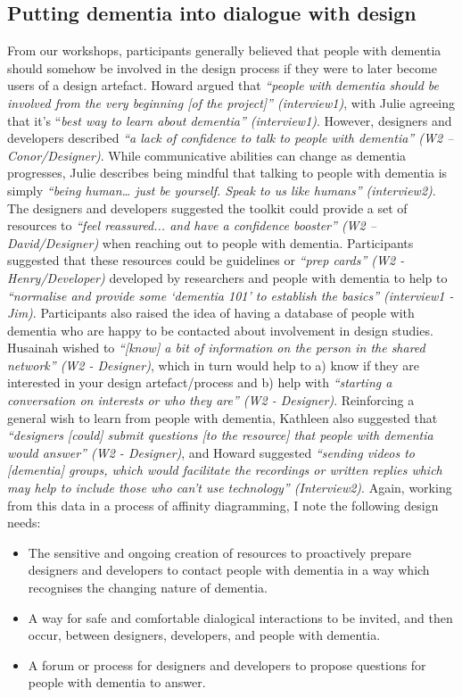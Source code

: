 \subsection{Putting dementia into dialogue with design}
From our workshops, participants generally believed that people with dementia should somehow be involved in the design process if they were to later become users of a design artefact. Howard argued that \textit{``people with dementia should be involved from the very beginning [of the project]'' (interview1)}, with Julie agreeing that it’s ``\textit{best way to learn about dementia'' (interview1)}. However, designers and developers described \textit{``a lack of confidence to talk to people with dementia'' (W2 – Conor/Designer)}. While communicative abilities can change as dementia progresses, Julie describes being mindful that talking to people with dementia is simply \textit{``being human… just be yourself. Speak to us like humans'' (interview2)}.
The designers and developers suggested the toolkit could provide a set of resources to \textit{``feel reassured... and have a confidence booster'' (W2 – David/Designer)} when reaching out to people with dementia. Participants suggested that these resources could be guidelines or \textit{``prep cards'' (W2 - Henry/Developer)} developed by researchers and people with dementia to help to \textit{``normalise and provide some ‘dementia 101’ to establish the basics'' (interview1 - Jim)}. Participants also raised the idea of having a database of people with dementia who are happy to be contacted about involvement in design studies. Husainah wished to \textit{``[know] a bit of information on the person in the shared network'' (W2 - Designer)}, which in turn would help to a) know if they are interested in your design artefact/process and b) help with \textit{``starting a conversation on interests or who they are'' (W2 - Designer)}.
Reinforcing a general wish to learn from people with dementia, Kathleen also suggested that \textit{``designers [could] submit questions [to the resource] that people with dementia would answer'' (W2 - Designer)}, and Howard suggested \textit{``sending videos to [dementia] groups, which would facilitate the recordings or written replies which may help to include those who can't use technology'' (Interview2)}. Again, working from this data in a process of affinity diagramming, I note the following design needs:
\begin{itemize}
\item The sensitive and ongoing creation of resources to proactively prepare designers and developers to contact people with dementia in a way which recognises the changing nature of dementia. 
\item A way for safe and comfortable dialogical interactions to be invited, and then occur, between designers, developers, and people with dementia.
\item A forum or process for designers and developers to propose questions for people with dementia to answer.
\end{itemize}

